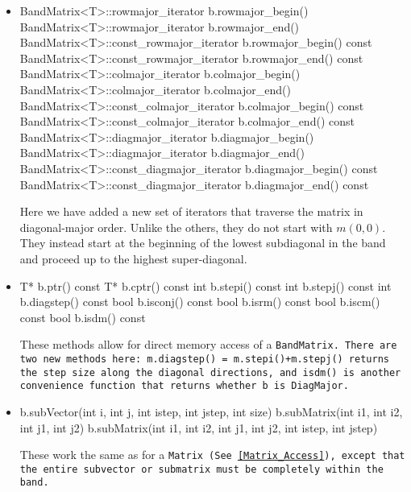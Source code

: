 \begin{itemize}
\item
\begin{tmvcode}
BandMatrix<T>::rowmajor_iterator b.rowmajor_begin()
BandMatrix<T>::rowmajor_iterator b.rowmajor_end()
BandMatrix<T>::const_rowmajor_iterator b.rowmajor_begin() const
BandMatrix<T>::const_rowmajor_iterator b.rowmajor_end() const
BandMatrix<T>::colmajor_iterator b.colmajor_begin()
BandMatrix<T>::colmajor_iterator b.colmajor_end()
BandMatrix<T>::const_colmajor_iterator b.colmajor_begin() const
BandMatrix<T>::const_colmajor_iterator b.colmajor_end() const
BandMatrix<T>::diagmajor_iterator b.diagmajor_begin()
BandMatrix<T>::diagmajor_iterator b.diagmajor_end()
BandMatrix<T>::const_diagmajor_iterator b.diagmajor_begin() const
BandMatrix<T>::const_diagmajor_iterator b.diagmajor_end() const
\end{tmvcode}
Here we have added a new set of iterators that traverse the matrix in diagonal-major order.  Unlike the others, they do not start with $m(0,0)$.  They instead start at the beginning of the lowest subdiagonal in the band and proceed up to the highest super-diagonal.

\item
\begin{tmvcode}
T* b.ptr()
const T* b.cptr() const
int b.stepi() const
int b.stepj() const
int b.diagstep() const
bool b.isconj() const
bool b.isrm() const
bool b.iscm() const
bool b.isdm() const
\end{tmvcode}
These methods allow for direct memory access of a \tt{BandMatrix}.  There are two new methods here: \tt{m.diagstep() = m.stepi()+m.stepj()} returns the step size along the diagonal directions, and \tt{isdm()} is another convenience function that returns whether \tt{b} is \tt{DiagMajor}. 

\item
\begin{tmvcode}
b.subVector(int i, int j, int istep, int jstep, int size)
b.subMatrix(int i1, int i2, int j1, int j2)
b.subMatrix(int i1, int i2, int j1, int j2, int istep, int jstep)
\end{tmvcode}
These work the same as for a \tt{Matrix}
(See \ref{Matrix_Access}),
except that the entire
subvector or submatrix must be completely within the band.


\end{itemize}
